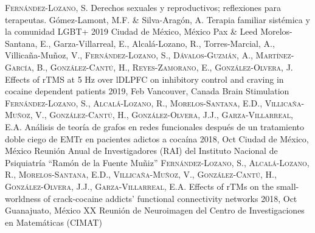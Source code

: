 {
\setlength\tabcolsep{0pt} \setlength{\extrarowheight}{0pt}%
\begin{itemize}[leftmargin=5ex, nosep, noitemsep, itemindent=-13pt,
    label=\raisebox{0.25ex}{\tiny$\bullet$}]%
    \vspace{-1.8mm}%
    \cvchapt
        {\scshape{Fernández-Lozano, S.}}
        {Derechos sexuales y reproductivos; reflexiones para terapeutas.}
        {Gómez-Lamont, M.F. \& Silva-Aragón, A.}
        {Terapia familiar sistémica y la comunidad LGBT+}
        {2019}
        {Ciudad de México, México}
        {Pax \& Leed}
    \cvposter
        {Morelos-Santana, E., Garza-Villarreal, E., Alcalá-Lozano, R.,
            Torres-Marcial, A., Villicaña-Muñoz, V., \scshape{Fernández-Lozano,
            S.}, Dávalos-Guzmán, A., Martínez-García, B., González-Cantú, H.,
            Reyes-Zamorano, E., González-Olvera, J.}
        {Effects of rTMS at 5 Hz over lDLPFC on inhibitory control and craving
            in cocaine dependent patients}
        {2019, Feb}
        {Vancouver, Canada}
        {Brain Stimulation}
    \cvposter
        {\scshape{Fernández-Lozano, S.}, Alcalá-Lozano, R., Morelos-Santana, E.D.,
            Villicaña-Muñoz, V., González-Cantú, H., González-Olvera, J.J.,
        Garza-Villarreal, E.A.}
        {Análisis de teoría de grafos en redes funcionales después de un
            tratamiento doble ciego de EMTr en pacientes adictos a cocaína}
        {2018, Oct}
        {Ciudad de México, México}
        {Reunión Anual de Investigadores (RAI) del Instituto Nacional de Psiquiatría ``Ramón de la Fuente Muñiz''}
    \cvposter
        {\scshape{Fernández-Lozano, S.}, Alcalá-Lozano, R., Morelos-Santana, E.D.,
            Villicaña-Muñoz, V., González-Cantú, H., González-Olvera, J.J.,
        Garza-Villarreal, E.A.}
        {Effects of rTMs on the small-worldness of crack-cocaine addicts' functional connectivity networks}
        {2018, Oct}
        {Guanajuato, México}
        {XX Reunión de Neuroimagen del Centro de Investigaciones en Matemáticas (CIMAT)}
\end{itemize}
}
